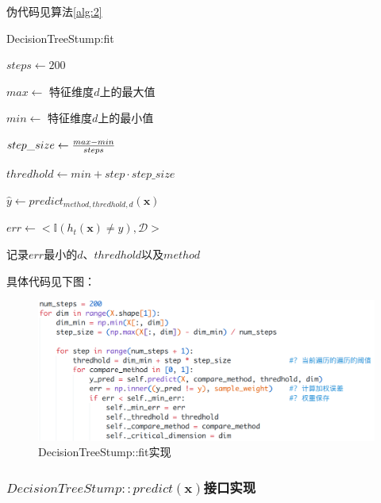 \documentclass{paper}
\begin{document}
伪代码见算法\ref{alg:2}

\begin{algorithm}[H]
    \SetAlgoLined
    \label{alg:2}
    \caption{DecisionTreeStump:fit}

    $steps \leftarrow 200$ 

    {
        $max \leftarrow$ 特征维度$d$上的最大值
        
        $min \leftarrow$ 特征维度$d$上的最小值

        $step\_size \leftarrow {{max - min} \over steps} $

        {
            $thredhold \leftarrow min + step \cdot step\_size$ 

            {
                $\hat{y} \leftarrow predict_{method,thredhold,d}(\mathbf{x})$

                $err \leftarrow <\mathbb{I}(h_t(\mathbf{x}) \neq y),\mathcal{D}>$ 

                记录$err$最小的$d$、$thredhold$以及$method$ 
            }
        }
    }


\end{algorithm}

具体代码见下图：
\begin{figure}[H]
    \begin{center}
        \includegraphics[scale = 0.35, frame]{images/df.png}
    \end{center}
    \caption{DecisionTreeStump::fit实现}
\end{figure}


\subsubsection{$DecisionTreeStump::predict(\mathbf{x})$接口实现} \label{d:p}
\end{document}
